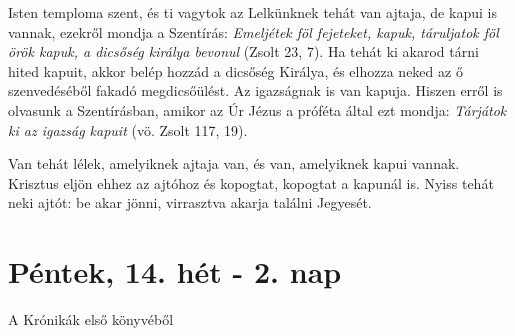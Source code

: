 \documentclass[twoside]{article}
\begin{document}
\begin{lectio}{Isten temploma szent, és ti vagytok az}
Lelkünknek tehát van ajtaja, de kapui is vannak, ezekről mondja a Szentírás: \textit{Emeljétek föl fejeteket, kapuk, táruljatok föl örök kapuk, a dicsőség királya bevonul} (Zsolt 23, 7). Ha tehát ki akarod tárni hited kapuit, akkor belép hozzád a dicsőség Királya, és elhozza neked az ő szenvedéséből fakadó megdicsőülést. Az igazságnak is van kapuja. Hiszen erről is olvasunk a Szentírásban, amikor az Úr Jézus a próféta által ezt mondja: \textit{Tárjátok ki az igazság kapuit} (vö. Zsolt 117, 19).

Van tehát lélek, amelyiknek ajtaja van, és van, amelyiknek kapui vannak. Krisztus eljön ehhez az ajtóhoz és kopogtat, kopogtat a kapunál is. Nyiss tehát neki ajtót: be akar jönni, virrasztva akarja találni Jegyesét.
\end{lectio}



\section*{Péntek, 14. hét - 2. nap}

A Krónikák első könyvéből
\end{document}

